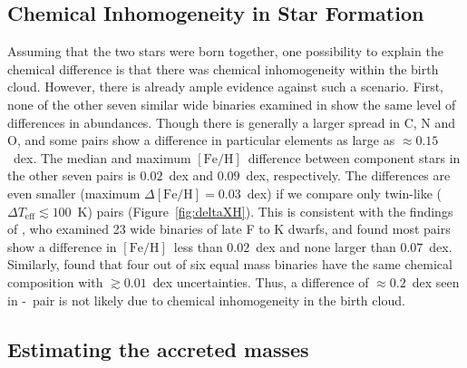 \documentclass[12pt,letterpaper,margin=1in]{article}
\newcommand{\figname}{Figure}
\newcommand*\elem[1]{\ensuremath{\mathrm{#1}}}
\newcommand*\elemH[1]{\ensuremath{[\mathrm{#1}/\elem{H}]}}
\newcommand*{\feh}{\ensuremath{\elemH{Fe}}}
\newcommand{\sunanalog}{\text{Krios}}
\newcommand{\bizarreone}{\text{Kronos}}
\begin{document}
\subsection*{Chemical Inhomogeneity in Star Formation}
\label{sub:chemical_inhomogeneity_in_star_formation}

Assuming that the two stars were born together, one possibility to
explain the chemical difference is that there was chemical inhomogeneity within
the birth cloud.
However, there is already ample evidence against such a scenario.
First, none of the other seven similar wide binaries examined in
\citealt{2016ApJS..225...32B} show the same level of differences in abundances.
Though there is generally a larger spread in $\elem{C}$, $\elem{N}$ and
$\elem{O}$, and some pairs show a difference in particular elements as large as
$\approx 0.15$~dex.
The median and maximum \feh\ difference between component stars in the other
seven pairs is $0.02$~dex and $0.09$~dex, respectively.
The differences are even smaller (maximum $\Delta\feh = 0.03$~dex) if we
compare only twin-like ($\Delta T_\mathrm{eff} \lesssim 100$~K) pairs
(\figname~\ref{fig:deltaXH}).
This is consistent with the findings of \citealt{Desidera:2004aa}, who examined
23 wide binaries of late F to K dwarfs, and found most pairs show a difference
in \feh\ less than $0.02$~dex and none larger than $0.07$~dex.
Similarly, \citealt{Gratton:2001aa} found that four out of six equal mass
binaries have the same chemical composition with $\gtrsim 0.01$~dex
uncertainties.
Thus, a difference of $\approx 0.2$~dex seen in \bizarreone-\sunanalog\ pair is
not likely due to chemical inhomogeneity in the birth cloud.

\subsection*{Estimating the accreted masses}
\end{document}

